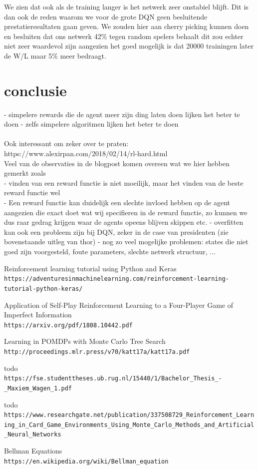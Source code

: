 \documentclass[11pt]{article}
\begin{document}
\noindent We zien dat ook als de training langer is het netwerk zeer onstabiel blijft. Dit is dan ook de reden waarom we voor de grote DQN geen besluitende prestatieresultaten gaan geven. We zouden hier aan cherry picking kunnen doen en besluiten dat ons netwerk 42\% tegen random spelers behaalt dit zou echter niet zeer waardevol zijn aangezien het goed mogelijk is dat 20000 trainingen later de W/L maar 5\% meer bedraagt.
\section{conclusie}
- simpelere rewards die de agent meer zijn ding laten doen lijken het beter te doen
- zelfs simpelere algoritmen lijken het beter te doen\\\\

Ook interessant om zeker over te praten:\\
https://www.alexirpan.com/2018/02/14/rl-hard.html\\
Veel van de observaties in de blogpost komen overeen wat we hier hebben gemerkt zoals\\
- vinden van een reward functie is niet moeilijk, maar het vinden van de beste reward functie wel\\
- Een reward functie kan duidelijk een slechte invloed hebben op de agent aangezien die exact doet wat wij specifieren in de reward functie, zo kunnen we dus raar gedrag krijgen waar de agents opeens blijven skippen etc.
- overfitten kan ook een probleem zijn bij DQN, zeker in de case van presidenten (zie bovenstaande uitleg van thor)
- nog zo veel mogelijke problemen: states die niet goed zijn voorgesteld, foute parameters, slechte netwerk structuur, ...

\newpage
\begin{thebibliography}{9}
Reinforcement learning tutorial using Python and Keras 
\\\texttt{https://adventuresinmachinelearning.com/reinforcement-learning-tutorial-python-keras/}

Application of Self-Play Reinforcement Learning to a Four-Player Game of Imperfect Information
\\\texttt{https://arxiv.org/pdf/1808.10442.pdf}

Learning in POMDPs with Monte Carlo Tree Search
\\\texttt{http://proceedings.mlr.press/v70/katt17a/katt17a.pdf}

todo
\\\texttt{https://fse.studenttheses.ub.rug.nl/15440/1/Bachelor\_Thesis\_-\_Maxiem\_Wagen\_1.pdf}

todo
\\\texttt{https://www.researchgate.net/publication/337508729\_Reinforcement\_Learning\_in\_Card\_Game\_Environments\_Using\_Monte\_Carlo\_Methods\_and\_Artificial\_Neural\_Networks}

Bellman Equations
\\\texttt{https://en.wikipedia.org/wiki/Bellman\_equation}
\end{thebibliography}
\newpage
\end{document}

